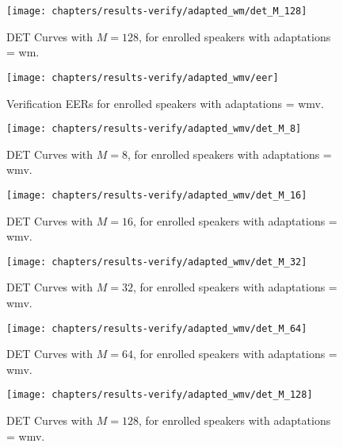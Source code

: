 \clearpage
\begin{figure}[ht]
	\centering
	\texttt{[image: chapters/results-verify/adapted\_wm/det\_M\_128]}
	\caption{DET Curves with $M = 128$, for enrolled speakers with adaptations = wm.}
	\label{fig:results-verify-adapted_wm-M_128}
\end{figure}

\newpage


\begin{figure}[ht]
	\centering
	\texttt{[image: chapters/results-verify/adapted\_wmv/eer]}
	\caption{Verification EERs for enrolled speakers with adaptations = wmv.}
	\label{fig:results-verify-adapted_wmv}
\end{figure}

\begin{figure}[ht]
	\centering
	\texttt{[image: chapters/results-verify/adapted\_wmv/det\_M\_8]}
	\caption{DET Curves with $M = 8$, for enrolled speakers with adaptations = wmv.}
	\label{fig:results-verify-adapted_wmv-M_8}
\end{figure}

\begin{figure}[ht]
	\centering
	\texttt{[image: chapters/results-verify/adapted\_wmv/det\_M\_16]}
	\caption{DET Curves with $M = 16$, for enrolled speakers with adaptations = wmv.}
	\label{fig:results-verify-adapted_wmv-M_16}
\end{figure}

\begin{figure}[ht]
	\centering
	\texttt{[image: chapters/results-verify/adapted\_wmv/det\_M\_32]}
	\caption{DET Curves with $M = 32$, for enrolled speakers with adaptations = wmv.}
	\label{fig:results-verify-adapted_wmv-M_32}
\end{figure}

\begin{figure}[ht]
	\centering
	\texttt{[image: chapters/results-verify/adapted\_wmv/det\_M\_64]}
	\caption{DET Curves with $M = 64$, for enrolled speakers with adaptations = wmv.}
	\label{fig:results-verify-adapted_wmv-M_64}
\end{figure}

\clearpage
\begin{figure}[ht]
	\centering
	\texttt{[image: chapters/results-verify/adapted\_wmv/det\_M\_128]}
	\caption{DET Curves with $M = 128$, for enrolled speakers with adaptations = wmv.}
	\label{fig:results-verify-adapted_wmv-M_128}
\end{figure}
